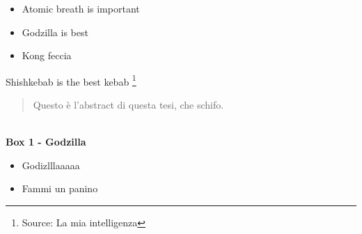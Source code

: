\begin{itemize}
    \item Atomic breath is important %
    \item Godzilla is best
    \item Kong feccia
\end{itemize}

Shishkebab is the best kebab
\footnote{Source: La mia intelligenza}

\usepackage{lineno} %
\linenumbers


\begin{abstract}
    Questo è l'abstract di questa tesi, che schifo.
\end{abstract}

\newpage
\hline
\\
\textbf{Box 1 - Godzilla}
\\
\begin{itemize}
    \item Godizlllaaaaa
    \item Fammi un panino
\end{itemize}
\hline







\documentclass[a4paper, 12pt]{article}
\usepackage{graphicx} %
\usepackage{lineno}
\usepackage{hyperref}
\usepackage{natbib}
\usepackage{color}
\linenumbers
\newcommand{\tb}{\textcolor{blue}}
\linespread{1.5}





\maketitle

$^1$ UNIBO - via Irnerio....

